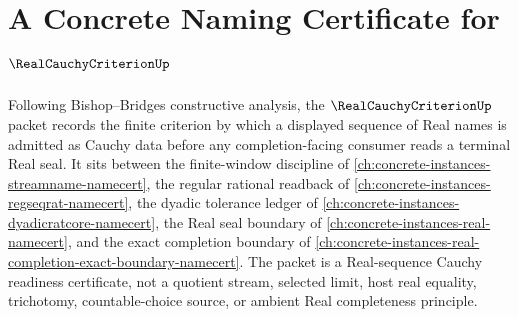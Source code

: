 \chapter{A Concrete Naming Certificate for $\RealCauchyCriterionUp$}
\label{ch:concrete-instances-real-cauchy-criterion-namecert}

Following Bishop--Bridges constructive analysis, the $\RealCauchyCriterionUp$ packet records the finite criterion by which a displayed sequence of Real names is admitted as Cauchy data before any completion-facing consumer reads a terminal Real seal. It sits between the finite-window discipline of \autoref{ch:concrete-instances-streamname-namecert}, the regular rational readback of \autoref{ch:concrete-instances-regseqrat-namecert}, the dyadic tolerance ledger of \autoref{ch:concrete-instances-dyadicratcore-namecert}, the Real seal boundary of \autoref{ch:concrete-instances-real-namecert}, and the exact completion boundary of \autoref{ch:concrete-instances-real-completion-exact-boundary-namecert}. The packet is a Real-sequence Cauchy readiness certificate, not a quotient stream, selected limit, host real equality, trichotomy, countable-choice source, or ambient Real completeness principle.

